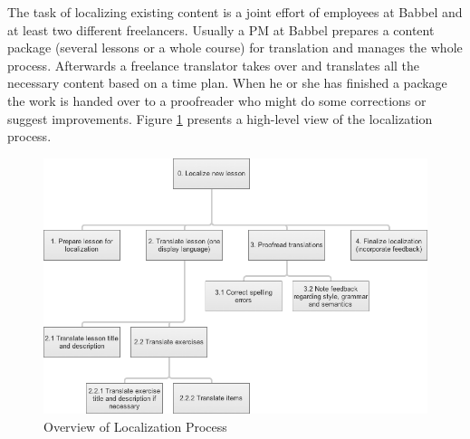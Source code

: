 The task of localizing existing content is a joint effort of employees at Babbel and at least two different freelancers. Usually a \ac{PM} at Babbel prepares a content package (several lessons or a whole course) for translation and manages the whole process. Afterwards a freelance translator takes over and translates all the necessary content based on a time plan. When he or she has finished a package the work is handed over to a proofreader who might do some corrections or suggest improvements. Figure \ref{fig:loc-overview} presents a high-level view of the localization process.

\begin{figure}[h]
 \centering
 \includegraphics[width=12cm]{images/task-analysis/localize_lesson}
 \caption{Overview of Localization Process}
 \label{fig:loc-overview}
\end{figure}



